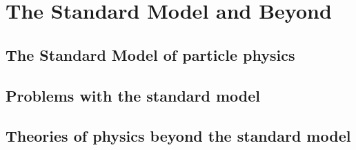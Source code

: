 \chapter{The Standard Model and Beyond}
\label{chap:theory}

\section{The Standard Model of particle physics}

\section{Problems with the standard model}

\section{Theories of physics beyond the standard model}
\label{sec:bsm}
